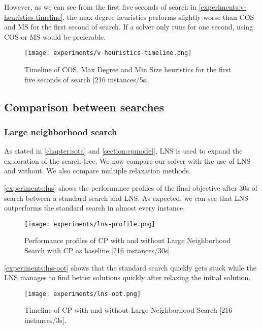 \documentclass[../../thesis.tex]{subfiles}
\begin{document}
However, as we can see from the first five seconds of search in \autoref{experiments:v-heuristics-timeline}, the 
max degree heuristics performs slightly worse than COS and MS for the first second of search. If a solver only runs for 
one second, using COS or MS would be preferable.

\begin{figure}
  \centering
  \texttt{[image: experiments/v-heuristics-timeline.png]}
  \caption{Timeline of COS, Max Degree and Min Size heuristics for the first five seconds of search [216 instances/5s].}
  \label{experiments:v-heuristics-timeline}
\end{figure}

\FloatBarrier

\subsection{Comparison between searches}

\subsubsection{Large neighborhood search}


As stated in \autoref{chapter:sota} and \autoref{section:cpmodel}, LNS is used to expand the exploration
of the search tree. We now compare our solver with the use of LNS and without. We also compare multiple 
relaxation methods.


\autoref{experiments:lns} shows the performance profiles of the final objective after 30s of search 
between a standard search and LNS. As expected, we can see that LNS outperforms the standard search 
in almost every instance. 

\begin{figure}
  \centering
  \texttt{[image: experiments/lns-profile.png]}
  \caption{Performance profiles of CP with and without Large Neighborhood Search with CP as baseline [216 instances/30s].}
  \label{experiments:lns}
\end{figure}


\autoref{experiments:lns-oot} shows that the standard search quickly gets stuck
while the LNS manages to find better solutions quickly after relaxing the initial solution.


\begin{figure}
  \centering
  \texttt{[image: experiments/lns-oot.png]}
  \caption{Timeline of CP with and without Large Neighborhood Search [216 instances/3s].}
  \label{experiments:lns-oot}
\end{figure}
\end{document}
